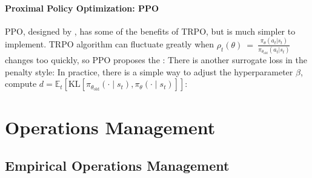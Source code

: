 \documentclass[12pt]{report}
\begin{document}
\subsubsection{Proximal Policy Optimization: PPO}
PPO, designed by \cite{schulman2017proximal}, has some of the benefits of TRPO, but is much simpler to implement. TRPO algorithm can fluctuate greatly when
$\rho_t(\theta)~=~\frac{\pi_\theta(a_t|s_t)}{\pi_{\theta_\mathrm{old}}(a_t|s_t)}$ changes too quickly, so PPO proposes the :
There is another surrogate loss in the penalty style:
In practice, there is a simple way to adjust the hyperparameter $\beta$, compute $d=\hat{\mathbb{E}}_t[\mathrm{KL}[\pi_{\theta_\mathrm{old}}(\cdot\mid s_t),\pi_\theta(\cdot\mid s_t)]]$:

\clearpage
\chapter{Operations Management}

\section{Empirical Operations Management}
\end{document}
